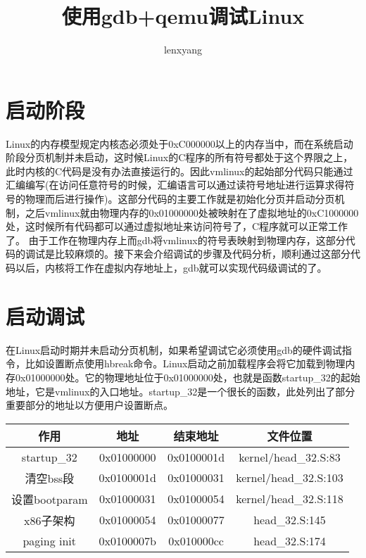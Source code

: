 \documentclass[b5paper,9pt,twoside,openany]{article}
\begin{document}
\title{使用gdb+qemu调试Linux}
\author{lenxyang}
\maketitle
\section{启动阶段} 
Linux的内存模型规定内核态必须处于0xC000000以上的内存当中，而在系统启动阶段分页机制并未启动，这时候Linux的C程序的所有符号都处于这个界限之上，此时内核的C代码是没有办法直接运行的。因此vmlinux的起始部分代码只能通过汇编编写(在访问任意符号的时候，汇编语言可以通过读符号地址进行运算求得符号的物理而后进行操作)。这部分代码的主要工作就是初始化分页并启动分页机制，之后vmlinux就由物理内存的0x01000000处被映射在了虚拟地址的0xC1000000处，这时候所有代码都可以通过虚拟地址来访问符号了，C程序就可以正常工作了。
由于工作在物理内存上而gdb将vmlinux的符号表映射到物理内存，这部分代码的调试是比较麻烦的。接下来会介绍调试的步骤及代码分析，顺利通过这部分代码以后，内核将工作在虚拟内存地址上，gdb就可以实现代码级调试的了。

\section{启动调试}
在Linux启动时期并未启动分页机制，如果希望调试它必须使用gdb的硬件调试指令，比如设置断点使用hbreak命令。Linux启动之前加载程序会将它加载到物理内存0x01000000处。它的物理地址位于0x01000000处，也就是函数startup\_32的起始地址，它是vmlinux的入口地址。startup\_32是一个很长的函数，此处列出了部分重要部分的地址以方便用户设置断点。

\begin{tabular}{|c|c|c|c|}
\hline
作用  & 地址 & 结束地址 & 文件位置 \\
\hline
startup\_32 & 0x01000000 & 0x0100001d & kernel/head\_32.S:83 \\
\hline
清空bss段 & 0x0100001d & 0x01000031 & kernel/head\_32.S:103 \\
\hline
设置bootparam & 0x01000031 & 0x01000054 & kernel/head\_32.S:118 \\
\hline
x86子架构 & 0x01000054 & 0x01000077 & head\_32.S:145 \\
\hline
paging init & 0x0100007b & 0x010000cc & head\_32.S:174 \\
\hline
\end{tabular}
\end{document}

